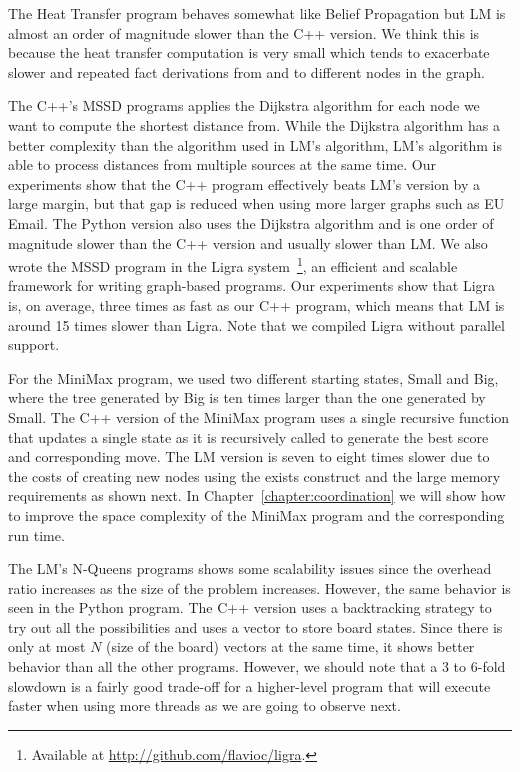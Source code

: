 The Heat Transfer program behaves somewhat like Belief Propagation but LM is
almost an order of magnitude slower than the C++ version. We think this is
because the heat transfer computation is very small which tends to exacerbate
slower and repeated fact derivations from and to different nodes in the graph.

The C++'s MSSD programs applies the Dijkstra algorithm for each node we want to
compute the shortest distance from. While the Dijkstra algorithm has a better
complexity than the algorithm used in LM's algorithm, LM's algorithm is able to
process distances from multiple sources at the same time. Our experiments show
that the C++ program effectively beats LM's version by a large margin, but that
gap is reduced when using more larger graphs such as EU Email. The Python
version also uses the Dijkstra algorithm and is one order of magnitude slower
than the C++ version and usually slower than LM. We also wrote the MSSD program
in the Ligra system~\cite{Shun:2013:LLG:2517327.2442530}\footnote{Available at
\url{http://github.com/flavioc/ligra}.}, an efficient and scalable framework
for writing graph-based programs. Our experiments show that Ligra is, on
average, three times as fast as our C++ program, which means that LM is
around 15 times slower than Ligra. Note that we compiled Ligra without
parallel support.

For the MiniMax program, we used two different starting states, Small and Big,
where the tree generated by Big is ten times larger than the one generated by
Small. The C++ version of the MiniMax program uses a single recursive function
that updates a single state as it is recursively called to generate the best
score and corresponding move. The LM version is seven to eight times slower due
to the costs of creating new nodes using the exists construct and the large
memory requirements as shown next. In Chapter~\ref{chapter:coordination} we will
show how to improve the space complexity of the MiniMax program and the
corresponding run time.

The LM's N-Queens programs shows some scalability issues since the overhead
ratio increases as the size of the problem increases. However, the same behavior
is seen in the Python program. The C++ version uses a backtracking strategy to
try out all the possibilities and uses a vector to store board states.  Since
there is only at most $N$ (size of the board) vectors at the same time, it shows
better behavior than all the other programs. However, we should note that a 3 to
6-fold slowdown is a fairly good trade-off for a higher-level program that will
execute faster when using more threads as we are going to observe next.

